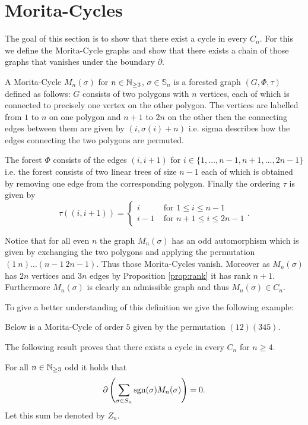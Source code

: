 \section{Morita-Cycles}
The goal of this section is to show that there exist a cycle in every $C_{n}$.
For this we define the Morita-Cycle graphs and show that there exists a chain of those graphs that vanishes under the boundary $\partial$.

\begin{definition}
	A Morita-Cycle $M_{n}(\sigma)$ for $n \in \mathbb{N}_{\geq 3}$, $\sigma \in \mathbb{S}_{n}$ is a forested graph $(G,\Phi,\tau)$ defined as follows:
	$G$ consists of two polygons with $n$ vertices, each of which is connected to precisely one vertex on the other polygon.
	The vertices are labelled from $1$ to $n$ on one polygon and $n+1$ to $2n$ on the other then the connecting edges between them are given by $(i,\sigma(i)+n)$ i.e.
	sigma describes how the edges connecting the two polygons are permuted.

	The forest $\Phi$ consists of the edges $(i,i+1)$ for $i \in \{1,\ldots,n-1, n+1,\ldots,2n-1\}$ i.e. the
	forest consists of two linear trees of size $n-1$ each of which is obtained by removing one edge from the corresponding polygon.
	Finally the ordering $\tau$ is given by
	\[
		\tau((i,i+1)) = \begin{cases}
			i & \text{ for } 1 \leq i \leq n-1\\ 
			i-1 & \text{ for } n+1 \leq i \leq 2n-1
		\end{cases}
	.\] 
\end{definition}
Notice that for all even $n$ the graph $M_{n}(\sigma)$ has an odd automorphism which is given by exchanging the two polygons and applying the permutation $(1\ n) \ldots (n-1\ 2n -1)$.
Thus those Morita-Cycles vanish.
Moreover as $M_{n}(\sigma)$ has $2n$ vertices and $3n$ edges by Proposition \ref{prop:rank} it has rank $n+1$.
Furthermore $M_{n}(\sigma)$ is clearly an admissible graph and thus $M_{n}(\sigma) \in C_{n}$.

To give a better understanding of this definition we give the following example:

\begin{eg}
	Below is a Morita-Cycle of order $5$ given by the permutation $(12)(345)$.
\end{eg}

The following result proves that there exists a cycle in every $C_{n}$ for $n \geq 4$.
\begin{theorem}
	For all $n \in \mathbb{N}_{\geq 3}$ odd it holds that 
	\[
		\partial\left(\sum_{\sigma \in S_{n}} \operatorname{sgn}(\sigma) M_{n}(\sigma)\right) = 0
	.\] 
	Let this sum be denoted by $Z_{n}$.
\end{theorem}

